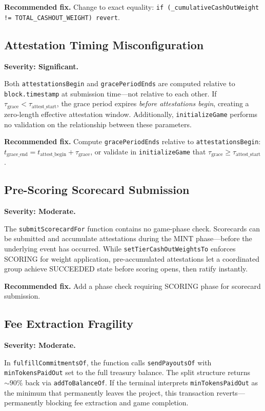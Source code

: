 \documentclass[11pt,a4paper]{article}
\begin{document}
\textbf{Recommended fix.} Change to exact equality: \texttt{if (\_cumulativeCashOutWeight != TOTAL\_CASHOUT\_WEIGHT) revert}.

\subsection{Attestation Timing Misconfiguration}

\textbf{Severity: Significant.}

Both \texttt{attestationsBegin} and \texttt{gracePeriodEnds} are computed relative to \texttt{block.timestamp} at submission time---not relative to each other. If $\tau_{\text{grace}} < \tau_{\text{attest\_start}}$, the grace period expires \emph{before attestations begin}, creating a zero-length effective attestation window. Additionally, \texttt{initializeGame} performs no validation on the relationship between these parameters.

\textbf{Recommended fix.} Compute \texttt{gracePeriodEnds} relative to \texttt{attestationsBegin}: $t_{\text{grace\_end}} = t_{\text{attest\_begin}} + \tau_{\text{grace}}$, or validate in \texttt{initializeGame} that $\tau_{\text{grace}} \geq \tau_{\text{attest\_start}}$.

\subsection{Pre-Scoring Scorecard Submission}

\textbf{Severity: Moderate.}

The \texttt{submitScorecardFor} function contains no game-phase check. Scorecards can be submitted and accumulate attestations during the MINT phase---before the underlying event has occurred. While \texttt{setTierCashOutWeightsTo} enforces SCORING for weight application, pre-accumulated attestations let a coordinated group achieve SUCCEEDED state before scoring opens, then ratify instantly.

\textbf{Recommended fix.} Add a phase check requiring SCORING phase for scorecard submission.

\subsection{Fee Extraction Fragility}

\textbf{Severity: Moderate.}

In \texttt{fulfillCommitmentsOf}, the function calls \texttt{sendPayoutsOf} with \texttt{minTokensPaidOut} set to the full treasury balance. The split structure returns ${\sim}90\%$ back via \texttt{addToBalanceOf}. If the terminal interprets \texttt{minTokensPaidOut} as the minimum that permanently leaves the project, this transaction reverts---permanently blocking fee extraction and game completion.
\end{document}
